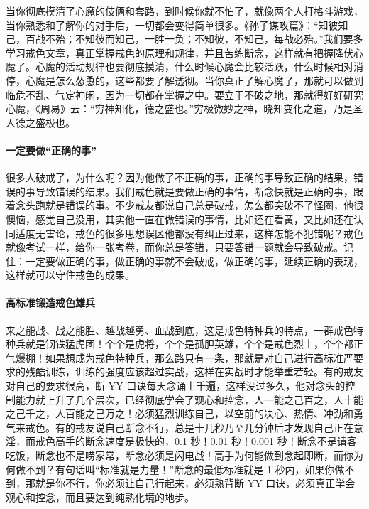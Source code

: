 当你彻底摸清了心魔的伎俩和套路，到时候你就不怕了，就像两个人打格斗游戏，当你熟悉和了解你的对手后，一切都会变得简单很多。《孙子谋攻篇》：“知彼知己，百战不殆；不知彼而知己，一胜一负；不知彼，不知己，每战必殆。”我们要多学习戒色文章，真正掌握戒色的原理和规律，并且苦练断念，这样就有把握降伏心魔了。心魔的活动规律也要彻底摸清，什么时候心魔会比较活跃，什么时候相对消停，心魔是怎么怂恿的，这些都要了解透彻。当你真正了解心魔了，那就可以做到临危不乱、气定神闲，因为一切都在掌握之中。要立于不破之地，那就得好好研究心魔，《周易》云：“穷神知化，德之盛也。”穷极微妙之神，晓知变化之道，乃是圣人德之盛极也。

\paragraph{一定要做“正确的事”}

很多人破戒了，为什么呢？因为他做了不正确的事，正确的事导致正确的结果，错误的事导致错误的结果。我们戒色就是要做正确的事情，断念快就是正确的事，跟着念头跑就是错误的事。不少戒友都说自己总是破戒，怎么都突破不了怪圈，他很懊恼，感觉自己没用，其实他一直在做错误的事情，比如还在看黄，又比如还在认同适度无害论，戒色的很多思想误区他都没有纠正过来，这样怎能不犯错呢？戒色就像考试一样，给你一张考卷，而你总是答错，只要答错一题就会导致破戒。记住：一定要做正确的事，做正确的事就不会破戒，做正确的事，延续正确的表现，这样就可以守住戒色的成果。

\paragraph{高标准锻造戒色雄兵}

来之能战、战之能胜、越战越勇、血战到底，这是戒色特种兵的特点，一群戒色特种兵就是钢铁猛虎团！个个是虎将，个个是孤胆英雄，个个是戒色烈士，个个都正气爆棚！如果想成为戒色特种兵，那么路只有一条，那就是对自己进行高标准严要求的残酷训练，训练的强度应该超过实战，这样在实战时才能举重若轻。有的戒友对自己的要求很高，断 YY 口诀每天念诵上千遍，这样没过多久，他对念头的控制能力就上升了几个层次，已经彻底学会了观心和控念，人一能之己百之，人十能之己千之，人百能之己万之！必须猛烈训练自己，以空前的决心、热情、冲劲和勇气来戒色。有的戒友说自己断念不行，总是十几秒乃至几分钟后才发现自己正在意淫，而戒色高手的断念速度是极快的，0.1 秒！0.01 秒！0.001 秒！断念不是请客吃饭，断念也不是唠家常，断念必须是闪电战！高手为何能做到念起即断，而你为何做不到？有句话叫“标准就是力量！”断念的最低标准就是 1 秒内，如果你做不到，那就是你不行，你必须让自己行起来，必须熟背断 YY 口诀，必须真正学会观心和控念，而且要达到纯熟化境的地步。

